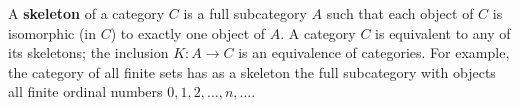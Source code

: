A \textbf{skeleton} of a category $C$ is a full subcategory $A$ such that each object of $C$ is isomorphic (in $C$) to exactly one object of $A$. A category $C$ is equivalent to any of its skeletons; the inclusion $K: A \to C$ is an equivalence of categories. For example, the category of all finite sets has as a skeleton the full subcategory with objects all finite ordinal numbers $0, 1, 2, \ldots, n, \ldots$.